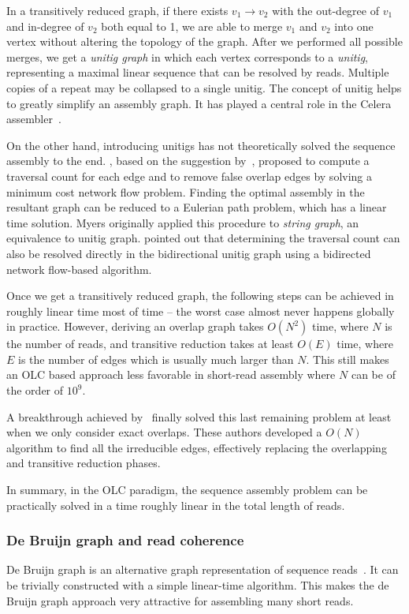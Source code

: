 \documentclass{bioinfo}
\begin{document}
\begin{methods}
In a transitively reduced graph, if there exists $v_1\to v_2$ with the
out-degree of $v_1$ and in-degree of $v_2$ both equal to 1, we are able to
merge $v_1$ and $v_2$ into one vertex without altering the topology of the
graph. After we performed all possible merges, we get a \emph{unitig graph} in
which each vertex corresponds to a \emph{unitig}, representing a maximal linear
sequence that can be resolved by reads. Multiple copies of a repeat may be
collapsed to a single unitig. The concept of unitig helps to greatly simplify
an assembly graph. It has played a central role in the Celera
assembler~\citep{Myers:2000kl}.

On the other hand, introducing unitigs has not theoretically solved the
sequence assembly to the end. \citet{Myers:2005bh}, based on the suggestion
by~\citet{Pevzner:2001vn}, proposed to compute a traversal count for each edge
and to remove false overlap edges by solving a minimum cost network flow
problem. Finding the optimal assembly in the resultant graph can be reduced to
a Eulerian path problem, which has a linear time solution. Myers originally
applied this procedure to \emph{string graph}, an equivalence to unitig graph.
\citet{Medvedev:2009ve} pointed out that determining the traversal count can
also be resolved directly in the bidirectional unitig graph using a bidirected
network flow-based algorithm.

Once we get a transitively reduced graph, the following steps can be achieved
in roughly linear time most of time -- the worst case almost never happens
globally in practice. However, deriving an overlap graph takes $O(N^2)$ time,
where $N$ is the number of reads, and transitive reduction takes at least
$O(E)$ time, where $E$ is the number of edges which is usually much larger than
$N$. This still makes an OLC based approach less favorable in short-read
assembly where $N$ can be of the order of $10^9$.

A breakthrough achieved by~\citet{Simpson:2010uq} finally solved
this last remaining problem at least when we only consider exact overlaps.
These authors developed a $O(N)$ algorithm to find all the irreducible edges,
effectively replacing the overlapping and transitive reduction phases.

In summary, in the OLC paradigm, the sequence assembly problem can be
practically solved in a time roughly linear in the total length of reads.

\subsubsection{De Bruijn graph and read coherence}
De Bruijn graph is an alternative graph representation of sequence
reads~\citep{Idury:1995oq}.  It can be trivially constructed with a simple
linear-time algorithm. This makes the de Bruijn graph approach very attractive
for assembling many short reads.


\end{methods}
\end{document}
